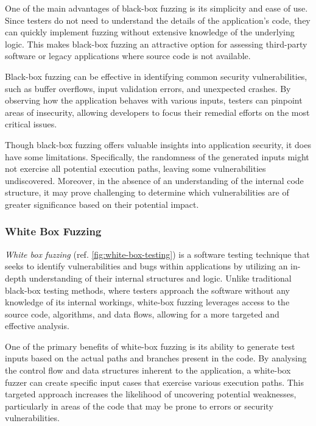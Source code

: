 One of the main advantages of black-box fuzzing is its simplicity and ease of use. Since testers do not need to understand the details of the application’s code, they can quickly implement fuzzing without extensive knowledge of the underlying logic. This makes black-box fuzzing an attractive option for assessing third-party software or legacy applications where source code is not available.

Black-box fuzzing can be effective in identifying common security vulnerabilities, such as buffer overflows, input validation errors, and unexpected crashes. By observing how the application behaves with various inputs, testers can pinpoint areas of insecurity, allowing developers to focus their remedial efforts on the most critical issues.

Though black-box fuzzing offers valuable insights into application security, it does have some limitations. Specifically, the randomness of the generated inputs might not exercise all potential execution paths, leaving some vulnerabilities undiscovered. Moreover, in the absence of an understanding of the internal code structure, it may prove challenging to determine which vulnerabilities are of greater significance based on their potential impact.
 \cite{godefroid_random_2007}

\subsubsection{White Box Fuzzing}
\label{sec:white-box}
\textit{White box fuzzing} (ref. \autoref{fig:white-box-testing}) is a software testing technique that seeks to identify vulnerabilities and bugs within applications by utilizing an in-depth understanding of their internal structures and logic. Unlike traditional black-box testing methods, where testers approach the software without any knowledge of its internal workings, white-box fuzzing leverages access to the source code, algorithms, and data flows, allowing for a more targeted and effective analysis.

One of the primary benefits of white-box fuzzing is its ability to generate test inputs based on the actual paths and branches present in the code. By analysing the control flow and data structures inherent to the application, a white-box fuzzer can create specific input cases that exercise various execution paths. This targeted approach increases the likelihood of uncovering potential weaknesses, particularly in areas of the code that may be prone to errors or security vulnerabilities.

